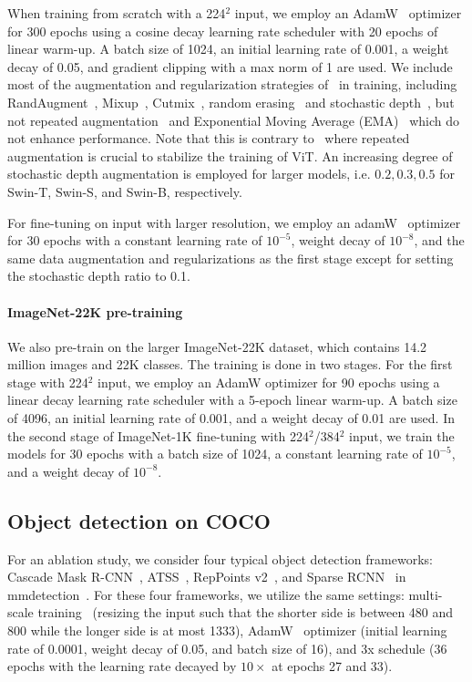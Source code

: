 \documentclass[10pt,twocolumn,letterpaper]{article}
\begin{document}
When training from scratch with a 224$^2$ input, we employ an AdamW~\cite{kingma2014adam} optimizer for 300 epochs using a cosine decay learning rate scheduler with 20 epochs of linear warm-up.  A batch size of 1024, an initial learning rate of 0.001, a weight decay of 0.05, and gradient clipping with a max norm of 1 are used. We include most of the augmentation and regularization strategies of~\cite{touvron2020deit} in training, including RandAugment~\cite{cubuk2020randaugment}, Mixup~\cite{zhang2017mixup}, Cutmix~\cite{yun2019cutmix}, random erasing~\cite{zhong2020random} and stochastic depth~\cite{huang2016deep}, but not repeated augmentation~\cite{hoffer2020augment} and Exponential Moving Average (EMA)~\cite{polyak1992acceleration} which do not enhance performance. Note that this is contrary to~\cite{touvron2020deit} where repeated augmentation is crucial to stabilize the training of ViT. An increasing degree of stochastic depth augmentation is employed for larger models, i.e. $0.2, 0.3, 0.5$ for Swin-T, Swin-S, and Swin-B, respectively.

For fine-tuning on input with larger resolution, we employ an adamW~\cite{kingma2014adam} optimizer for 30 epochs with a constant learning rate of $10^{-5}$, weight decay of $10^{-8}$, and the same data augmentation and regularizations as the first stage except for setting the stochastic depth ratio to 0.1.

\paragraph{ImageNet-22K pre-training} We also pre-train on the larger ImageNet-22K dataset, which contains 14.2 million images and 22K classes. The training is done in two stages. For the first stage with 224$^2$ input, we employ an AdamW optimizer for 90 epochs using a linear decay learning rate scheduler with a 5-epoch linear warm-up. A batch size of 4096, an initial learning rate of 0.001, and a weight decay of 0.01 are used. In the second stage of ImageNet-1K fine-tuning with 224$^2$/384$^2$ input, we train the models for 30 epochs with a batch size of 1024, a constant learning rate of $10^{-5}$, and a weight decay of $10^{-8}$.

\subsection{Object detection on COCO}

For an ablation study, we consider four typical object detection frameworks: Cascade Mask R-CNN~\cite{he2017mask,cai2018cascade}, ATSS~\cite{zhang2020bridging}, RepPoints v2~\cite{chen2020reppointsv2}, and Sparse RCNN~\cite{sun2020sparsercnn} in mmdetection~\cite{chen2019mmdetection}. For these four frameworks, we utilize the same settings: multi-scale training~\cite{carion2020detr,sun2020sparsercnn} (resizing the input such that the shorter side is between 480 and 800 while the longer side is at most 1333), AdamW~\cite{loshchilov2017decoupled} optimizer (initial learning rate of 0.0001, weight decay of 0.05, and batch size of 16), and 3x schedule (36 epochs with the learning rate decayed by $10\times$ at epochs 27 and 33).
\end{document}

